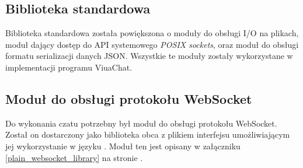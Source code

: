 \subsection{Biblioteka standardowa}

Biblioteka standardowa została powiększona o moduły do obsługi I/O na plikach,
moduł dający dostęp do API systemowego \emph{POSIX sockets}, oraz moduł do
obsługi formatu serializacji danych JSON.
Wszystkie te moduły zostały wykorzystane w implementacji programu ViuaChat.

\subsection{Moduł do obsługi protokołu WebSocket}

Do wykonania czatu potrzebny był moduł do obsługi protokołu WebSocket.
Został on dostarczony jako biblioteka obca z plikiem interfejsu umożliwiającym
jej wykorzystanie w języku \ViuAct. Moduł ten jest opisany w załączniku
\ref{plain_websocket_library} na stronie \pageref{plain_websocket_library}.
